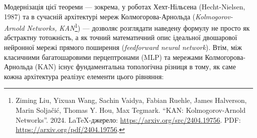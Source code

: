 \documentclass[12pt,a4paper]{article}
\begin{document}
	Модернізація цієї теореми — зокрема, у роботах Хехт-Нільсена (Hecht-Nielsen, 1987) та в сучасній архітектурі мереж Колмогорова-Арнольда (\textit{Kolmogorov-Arnold Networks, KAN}\footnote{Ziming Liu, Yixuan Wang, Sachin Vaidya, Fabian Ruehle, James Halverson, Marin Soljačić, Thomas Y. Hou, Max Tegmark. ``KAN: Kolmogorov-Arnold Networks''. 2024. LaTeX-джерело: \url{https://arxiv.org/src/2404.19756}. PDF: \url{https://arxiv.org/pdf/2404.19756}.}) — дозволяє розглядати наведену формулу не просто як абстрактну тотожність, а як точний математичний опис ідеальної двошарової нейронної мережі прямого поширення (\textit{feedforward neural network}). Втім, між класичними багатошаровими перцептронами (MLP) та мережами Колмогорова-Арнольда (KAN) існує фундаментальна топологічна різниця в тому, як саме кожна архітектура реалізує елементи цього рівняння:
	
\end{document}
